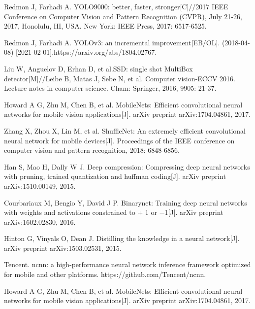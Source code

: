 \documentclass{ctexart}
\numberwithin{equation}{section}%
\numberwithin{figure}{section}%
\numberwithin{table}{section}%
\begin{document}
\begin{thebibliography}{99}
	Redmon J, Farhadi A. YOLO9000: better, faster, stronger[C]//2017 IEEE Conference on Computer Vision and Pattern Recognition (CVPR), July 21-26, 2017, Honolulu, HI, USA. New York: IEEE Press, 2017: 6517-6525.
	
	Redmon J, Farhadi A. YOLOv3: an incremental improvement[EB/OL]. (2018-04-08) [2021-02-01].https://arxiv.org/abs/1804.02767.
	
	Liu W, Anguelov D, Erhan D, et al.SSD: single shot MultiBox detector[M]//Leibe B, Matas J, Sebe N, et al. Computer vision-ECCV 2016. Lecture notes in computer science. Cham: Springer, 2016, 9905: 21-37.
	
	Howard A G, Zhu M, Chen B, et al. MobileNets: Efficient convolutional neural networks for mobile vision applications[J]. arXiv preprint arXiv:1704.04861, 2017.
	
	Zhang X, Zhou X, Lin M, et al. ShuffleNet: An extremely efficient convolutional neural network for mobile devices[J]. Proceedings of the IEEE conference on computer vision and pattern recognition, 2018: 6848-6856.
	
	Han S, Mao H, Dally W J. Deep compression: Compressing deep neural networks with pruning, trained quantization and huffman coding[J]. arXiv preprint arXiv:1510.00149, 2015.
	
	
	Courbariaux M, Bengio Y, David J P. Binarynet: Training deep neural networks with weights and activations constrained to + 1 or −1[J]. arXiv preprint arXiv:1602.02830, 2016.
	
	Hinton G, Vinyals O, Dean J. Distilling the knowledge in a neural network[J]. arXiv preprint arXiv:1503.02531, 2015.
	
	
	
	
	
	Tencent. ncnn: a high-performance neural network inference framework optimized for mobile and other platforms. https://github.com/Tencent/ncnn.
	
	Howard A G, Zhu M, Chen B, et al. MobileNets: Efficient convolutional neural networks for mobile vision applications[J]. arXiv preprint arXiv:1704.04861, 2017.
	

\end{thebibliography}
\end{document}
